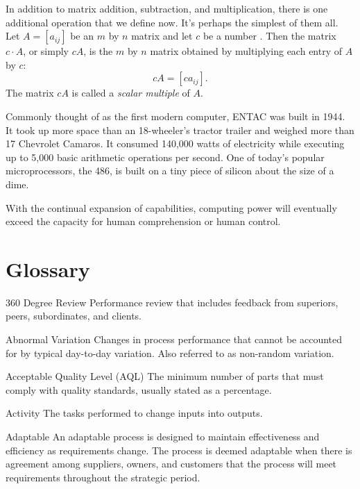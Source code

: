 In addition to matrix addition, subtraction, and multiplication, there is
one additional operation that we define now. It's perhaps the simplest of
them all. Let $A=[a_{ij}]$ be an $m$ by $n$ matrix and let $c$ be a
number \cite{hyvarinen2001ica}. Then the matrix $c\cdot A$, or simply $cA$, is the $m$ by $n$
matrix obtained by multiplying each entry of $A$ by $c$:
\[c A=[ca_{ij}].\] 
The matrix $c A$ is called a {\it scalar multiple} of $A$.

\begin{VT1}


Commonly thought of as the first modern computer, ENTAC was built in 1944. It took up more space than an 18-wheeler's
tractor trailer and weighed more than 17 Chevrolet Camaros. It consumed 140,000 watts of electricity while executing
up to 5,000 basic arithmetic operations per second. One of today's popular microprocessors, the 486, is built on a
tiny piece of silicon about the size of a dime.

\VT
With the continual expansion of capabilities, computing power will eventually exceed the capacity for human
comprehension or human control.

\end{VT1}


\section{Glossary}
\begin{Glossary}
\item[360 Degree Review] Performance review that includes feedback from superiors, peers, subordinates, and clients.
\item[Abnormal Variation] Changes in process performance that cannot be accounted for by typical day-to-day variation. Also referred to as
non-random variation.
\item[Acceptable Quality Level (AQL)] The minimum number of parts that must comply with quality standards, usually stated as a percentage.
\item[Activity] The tasks performed to change inputs into outputs.
\item[Adaptable] An adaptable process is designed to maintain effectiveness and efficiency as requirements change. The process is
deemed adaptable when there is agreement among suppliers, owners, and customers that the process will meet
requirements throughout the strategic period.
\end{Glossary}



